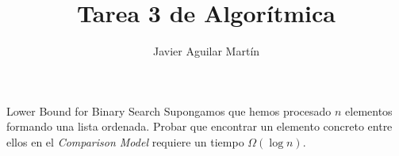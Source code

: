 \documentclass[twoside]{article}
\begin{document}
\title{Tarea 3 de Algorítmica}
\author{Javier Aguilar Martín}
\maketitle


\begin{ejercicio}{Lower Bound for Binary Search}
Supongamos que hemos procesado $n$ elementos formando una lista ordenada. Probar que encontrar un elemento concreto entre ellos en el \emph{Comparison Model} requiere un tiempo $\Omega(\log n)$. 
\end{ejercicio}
\begin{solucion}



\end{solucion}
\end{document}
